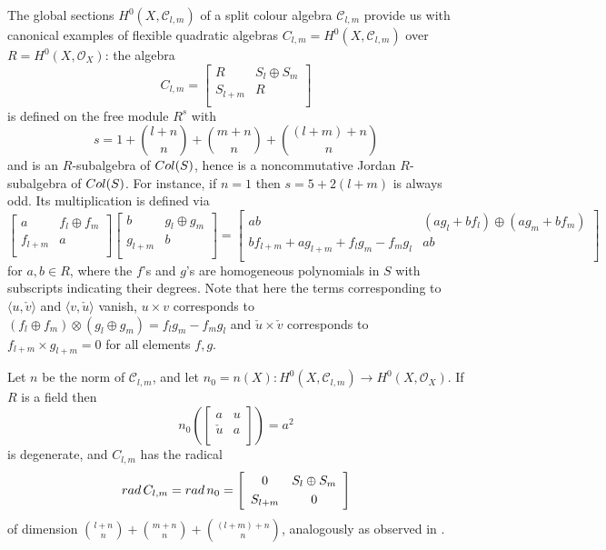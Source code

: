 \documentclass[10pt]{amsart}
\theoremstyle{plain}
\theoremstyle{definition}
\begin{document}
 The global sections $H^0(X, \mathcal{C}_{l,m})$ of a split colour algebra
$\mathcal{C}_{l,m}$ provide us with canonical examples of flexible quadratic algebras $ C_{l,m}=H^0(X, \mathcal{C}_{l,m})$ over $R=H^0(X, \mathcal{O}_X)$: the algebra
\[ C_{l,m}=
\left [\begin {array}{cc}
R&S_l\oplus S_m\\
S_{l+m}&R\\
\end {array}\right ]
\]
is defined on the free module $R^s$ with
$$s=1+\binom{l+n}{n}+\binom{m+n}{n}+\binom{(l+m)+n}{n}$$
 and is an $R$-subalgebra  of $ {\rm Col}(S)$, hence is a noncommutative Jordan $R$-subalgebra of $ {\rm Col}(S)$. For instance, if $n=1$ then $s=
5+2(l+m)$
is always odd. Its multiplication is defined via
\[
\left [\begin {array}{cc}
 a & f_l\oplus f_m\\
f_{l+m}  &  a \\
\end {array}\right ]
\left [\begin {array}{cc}
 b & g_l\oplus g_m\\
g_{l+m}  &  b \\
\end {array}\right ]
=
\left [\begin {array}{cc}
 ab & (ag_l+bf_l)\oplus (ag_m+bf_m)\\
bf_{l+m}+ag_{l+m}+f_lg_m-f_mg_l &  ab \\
\end {array}\right ]
\]
for $a,b\in R$, where the $f$'s and $g$'s are homogeneous polynomials in $S$ with subscripts
indicating their degrees.
Note that here the terms corresponding to $\langle u,\check{v}\rangle $ and $\langle v,\check{u}\rangle$ vanish, $u\times v$ corresponds to $(f_l\oplus f_m)\otimes ( g_l\oplus g_m)=f_l g_m-f_m g_l$
and $\check{u}\times \check{v}$ corresponds to $f_{l+m} \times g_{l+m} =0$ for all elements $f,g$.

Let $n$ be the norm of $\mathcal{C}_{l,m}$, and let $n_0=n(X):H^0(X, \mathcal{C}_{l,m})\to H^0(X, \mathcal{O}_X)$.
 If $R$ is a field then
 $$
n_0(
\left [\begin {array}{cc}
 a & u\\
\check{u}  &  a \\
\end {array}\right ])=
a^2$$
is  degenerate, and  $C_{l,m}$ has the radical
\[{\rm rad}\,C_{l,m}= {\rm rad}\,n_0=
\left [\begin {array}{cc}
0&S_l\oplus S_m\\
\noalign{\smallskip}
S_{l+m}&0\\
\end {array}\right ]
\]
 of dimension
$\binom{l+n}{n}+\binom{m+n}{n}+\binom{(l+m)+n}{n}$,
analogously as observed in \cite[3.8]{P2}.
\end{document}
